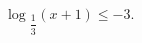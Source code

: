 \begin{ex}[type=inequality]
	\begin{condition}
		$ \log$\tiny$_{\dfrac{1}{3}}$\normalsize$(x + 1) \leqslant-3 .$
	\end{condition}
\end{ex}